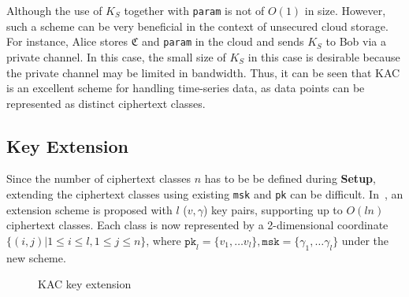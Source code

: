 \documentclass[hyp,a4paper,12pt,openbib]{socreport}
\begin{document}
Although the use of $K_S$ together with \texttt{param} is not of $O(1)$ in size. However, such a scheme can be very beneficial in the context of unsecured cloud storage. For instance, Alice stores $\mathfrak{C}$ and \texttt{param} in the cloud and sends $K_S$ to Bob via a private channel. In this case, the small size of $K_S$ in this case is desirable because the private channel may be limited in bandwidth. Thus, it can be seen that KAC is an excellent scheme for handling time-series data, as data points can be represented as distinct ciphertext classes.

\subsection{Key Extension}

Since the number of ciphertext classes $n$ has to be be defined during \textbf{Setup}, extending the ciphertext classes using existing \texttt{msk} and \texttt{pk} can be difficult. In~\cite{chu2013key}, an extension scheme is proposed with $l$ ($v, \gamma$) key pairs, supporting up to $O(ln)$ ciphertext classes. Each class is now represented by a 2-dimensional coordinate $\{ (i, j) | 1 \leq i \leq l, 1 \leq j \leq n\}$, where $\texttt{pk}_l = \{ v_1,\dots v_l \}, \texttt{msk} = \{\gamma_1, \dots \gamma_l\}$ under the new scheme.

\begin{figure}[h]
\centering
{}
\caption{KAC key extension} \label{fig:kac-extend}
\end{figure}
\end{document}
